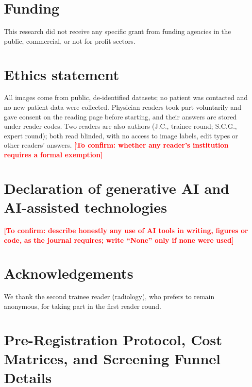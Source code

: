 \documentclass[5p,times,twocolumn,authoryear]{elsarticle}
\newcommand{\toconfirm}[1]{\textcolor{red}{\textbf{[To confirm: #1]}}}
\begin{document}
\section*{Funding}
This research did not receive any specific grant from funding agencies in the public, commercial, or not-for-profit sectors.

\section*{Ethics statement}
All images come from public, de-identified datasets; no patient was contacted and no new patient data were collected. Physician readers took part voluntarily and gave consent on the reading page before starting, and their answers are stored under reader codes. Two readers are also authors (J.C., trainee round; S.C.G., expert round); both read blinded, with no access to image labels, edit types or other readers' answers. \toconfirm{whether any reader's institution requires a formal exemption}

\section*{Declaration of generative AI and AI-assisted technologies}
\toconfirm{describe honestly any use of AI tools in writing, figures or code, as the journal requires; write ``None'' only if none were used}

\section*{Acknowledgements}
We thank the second trainee reader (radiology), who prefers to remain anonymous, for taking part in the first reader round.




\newpage
\onecolumn
\appendix

\section{Pre-Registration Protocol, Cost Matrices, and Screening Funnel Details}
\label{app:prereg_and_funnel}
\end{document}
